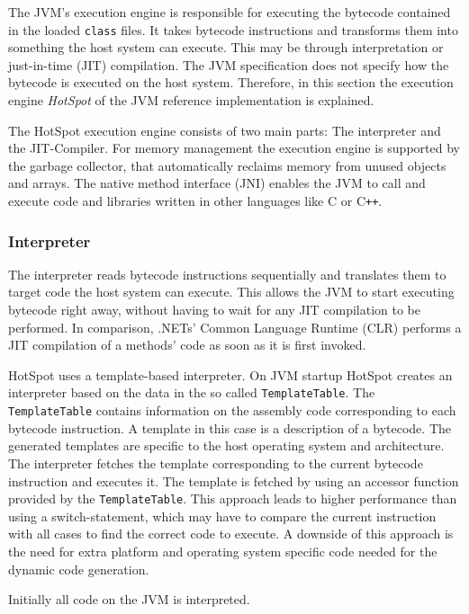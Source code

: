 The JVM's execution engine is responsible for executing the bytecode contained in the loaded \texttt{class} files. It takes bytecode instructions and transforms them into something the host system can execute. This may be through interpretation or just-in-time (JIT) compilation. The JVM specification does not specify how the bytecode is executed on the host system. Therefore, in this section the execution engine \textit{HotSpot} of the JVM reference implementation \textcite{OpenJDKHotspotRuntime} is explained.

The HotSpot execution engine consists of two main parts: The interpreter and the JIT-Compiler. For memory management the execution engine is supported by the garbage collector, that automatically reclaims memory from unused objects and arrays. The native method interface (JNI) enables the JVM to call and execute code and libraries written in other languages like C or C\verb|++|.

\subsubsection{Interpreter}

The interpreter reads bytecode instructions sequentially and translates them to target code the host system can execute. This allows the JVM to start executing bytecode right away, without having to wait for any JIT compilation to be performed. In comparison, .NETs' Common Language Runtime (CLR) performs a JIT compilation of a methods' code as soon as it is first invoked\parencite{MicrosoftCILToNative}. 

HotSpot uses a template-based interpreter. On JVM startup HotSpot creates an interpreter based on the data in the so called \texttt{TemplateTable}. The \texttt{TemplateTable} contains information on the assembly code corresponding to each bytecode instruction. A template in this case is a description of a bytecode. The generated templates are specific to the host operating system and architecture. The interpreter fetches the template corresponding to the current bytecode instruction and executes it. The template is fetched by using an accessor function provided by the \texttt{TemplateTable}. This approach leads to higher performance than using a switch-statement, which may have to compare the current instruction with all cases to find the correct code to execute. A downside of this approach is the need for extra platform and operating system specific code needed for the dynamic code generation. 

Initially all code on the JVM is interpreted.  